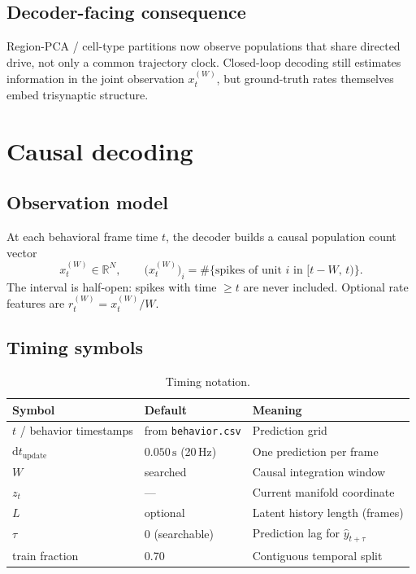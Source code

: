 \documentclass[11pt,a4paper]{article}
\begin{document}
\subsection{Decoder-facing consequence}
Region-PCA / cell-type partitions now observe populations that share directed drive, not only a common trajectory clock.
Closed-loop decoding still estimates information in the joint observation $x_t^{(W)}$, but ground-truth rates themselves embed trisynaptic structure.

\section{Causal decoding}
\label{sec:causal}

\subsection{Observation model}
At each behavioral frame time $t$, the decoder builds a causal population count vector
\begin{equation}
  x_t^{(W)} \in \mathbb{R}^{N},
  \qquad
  \bigl(x_t^{(W)}\bigr)_i
  =
  \#\bigl\{\text{spikes of unit } i \text{ in } [t-W,\, t)\bigr\}.
  \label{eq:counts}
\end{equation}
The interval is half-open: spikes with time $\ge t$ are never included.
Optional rate features are $r_t^{(W)} = x_t^{(W)} / W$.

\subsection{Timing symbols}
\begin{table}[h]
\centering
\caption{Timing notation.}
\label{tab:timing}
\begin{tabular}{@{}lll@{}}
\toprule
Symbol & Default & Meaning \\
\midrule
$t$ / behavior timestamps & from \texttt{behavior.csv} & Prediction grid \\
$\mathrm{d}t_{\mathrm{update}}$ & $0.050\,\mathrm{s}$ (20\,Hz) & One prediction per frame \\
$W$ & searched & Causal integration window \\
$z_t$ & --- & Current manifold coordinate \\
$L$ & optional & Latent history length (frames) \\
$\tau$ & $0$ (searchable) & Prediction lag for $\hat y_{t+\tau}$ \\
train fraction & 0.70 & Contiguous temporal split \\
\bottomrule
\end{tabular}
\end{table}
\end{document}
